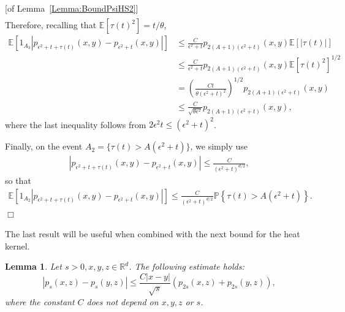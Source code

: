 \documentclass[12pt]{article}
\newenvironment {proof}{{\noindent\bf Proof }}{\hfill $\Box$ \medskip}
\newtheorem{lemma}[theorem]{Lemma}
\newcommand{\IP}{\mathbb P}
\newcommand{\IE}{\mathbb E}
\newcommand{\IR}{\mathbb R}
\begin{document}
\begin{proof}[of Lemma~\ref{Lemma:BoundPsiHS2}]
\begin{align*}
    \end{align*}
    Therefore, recalling that $\IE[\tau(t)^2] = t / \theta$,
    \begin{align*}
        \IE\left[
            1_{A_3}
            \left|
                p_{\epsilon^2 + t + \tau(t)}(x, y)
                -
                p_{\epsilon^2 + t}(x, y)
            \right|
        \right]
        &\le
            \frac{C}{\epsilon^2 + t}
                p_{2(A + 1)(\epsilon^2 + t)}(x, y)
            \IE\left[|\tau(t)|\right]
        \\ &\le
            \frac{C}{\epsilon^2 + t}
                p_{2(A + 1)(\epsilon^2 + t)}(x, y)
            \IE\left[\tau(t)^2\right]^{1/2}
        \\ &=
            \left( \frac{Ct}{\theta(\epsilon^2 + t)^2} \right)^{1/2}
                p_{2(A + 1)(\epsilon^2 + t)}(x, y)
        \\ &\le
            \frac{C}{\sqrt{\theta \epsilon^2}}
                p_{2(A + 1)(\epsilon^2 + t)}(x, y) ,
    \end{align*}
    where the last inequality follows from $2 \epsilon^2 t \le (\epsilon^2 + t)^2$.

    Finally, on the event $A_2 = \{\tau(t) > A(\epsilon^2 + t)\}$,
    we simply use
    \begin{align*}
        \left|
            p_{\epsilon^2 + t + \tau(t)}(x, y)
            -
            p_{\epsilon^2 + t}(x, y)
        \right|
        \le
        \frac{C}{(\epsilon^2 + t)^{d/2}} ,
    \end{align*}
    so that
    \begin{align*}
        \IE\left[
        1_{A_2}
        \left|
            p_{\epsilon^2 + t + \tau(t)}(x, y)
            -
            p_{\epsilon^2 + t}(x, y)
        \right|
        \right]
        \le
        \frac{C}{(\epsilon^2 + t)^{d/2}}
        \IP\left\{
            \tau(t) > A (\epsilon^2 + t)
        \right\} .
    \end{align*}
\end{proof}

The last result will be useful when combined with the next bound for the heat kernel.

\begin{lemma}
    \label{Lemma:ContinuityHS}
Let $s>0, x, y, z\in \IR^d$. The following estimate holds:
\[
    |p_s(x,z) - p_s(y,z)|
    \leq
    \frac{C|x-y|}{\sqrt{s}} \left(p_{2s}(x,z) + p_{2s}(y,z)\right) ,
\]
where the constant $C$ does not depend on $x,y,z$ or $s$.
\end{lemma}
\end{document}
